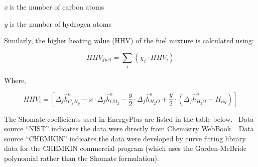 \emph{x} is the number of carbon atoms

\emph{y} is the number of hydrogen atoms

Similarly, the higher heating value (HHV) of the fuel mixture is calculated using:

\begin{equation}
HH{V_{fuel}} = \sum\limits_i {\left( {{\chi_i} \cdot HH{V_i}} \right)}
\end{equation}

Where,

\begin{equation}
HH{V_i} = \left[ {{\Delta_f}\hat h_{{C_x}{H_y}}^o - x \cdot {\Delta_f}\hat h_{C{O_2}}^o - \frac{y}{2} \cdot {\Delta_f}\hat h_{{H_2}O}^o + \frac{y}{2} \cdot \left( {{\Delta_f}\hat h_{{H_2}O}^o - {H_{liq}}} \right)} \right]
\end{equation}

The Shomate coefficients used in EnergyPlus are listed in the table below.~ Data source ``NIST'' indicates the data were directly from Chemistry WebBook.~ Data source ``CHEMKIN'' indicates the data were developed by curve fitting library data for the CHEMKIN commercial program (which uses the Gorden-McBride polynomial rather than the Shomate formulation).

